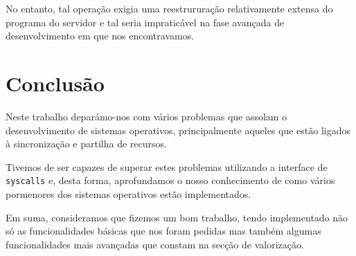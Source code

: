 \documentclass[a4paper,12pt,titlepage,portuguese]{article}
\begin{document}
No entanto, tal operação exigia uma reestrururação relativamente extensa do programa do servidor e tal seria impraticável na fase avançada de desenvolvimento em que nos encontravamos.

\section{Conclusão}

Neste trabalho deparámo-nos com vários problemas que assolam o desenvolvimento de sistemas operativos, principalmente aqueles que estão ligados à sincronização e partilha de recursos. 

Tivemos de ser capazes de superar estes problemas utilizando a interface de \texttt{syscalls} e, desta forma, aprofundamos o nosso conhecimento de como vários pormenores dos sistemas operativos estão implementados. 

Em suma, consideramos que fizemos um bom trabalho, tendo implementado não só as funcionalidades básicas que nos foram pedidas mas também algumas funcionalidades mais avançadas que constam na secção de valorização.
\end{document}
